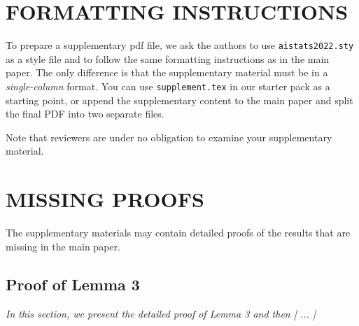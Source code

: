 \documentclass[twoside]{article}
\begin{document}
%

%

\onecolumn
{}

\section{FORMATTING INSTRUCTIONS}

To prepare a supplementary pdf file, we ask the authors to use \texttt{aistats2022.sty} as a style file and to follow the same formatting instructions as in the main paper.
The only difference is that the supplementary material must be in a \emph{single-column} format.
You can use \texttt{supplement.tex} in our starter pack as a starting point, or append the supplementary content to the main paper and split the final PDF into two separate files.

Note that reviewers are under no obligation to examine your supplementary material.

\section{MISSING PROOFS}

The supplementary materials may contain detailed proofs of the results that are missing in the main paper.

\subsection{Proof of Lemma 3}

\textit{In this section, we present the detailed proof of Lemma 3 and then [ ... ]}
\end{document}
